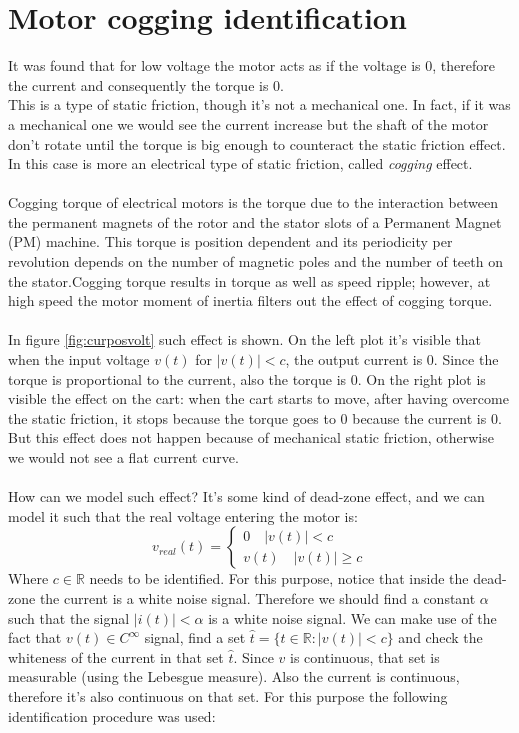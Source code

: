 \section{Motor cogging identification}
It was found that for low voltage the motor acts as if the voltage is $0$, therefore the current and consequently the torque is $0$.\\
This is  a type of static friction, though it's not a mechanical one. In fact, if it was a mechanical one we would see the current increase but the shaft of the motor don't rotate until the torque is big enough to counteract the static friction effect. In this case is more an electrical type of static friction, called \emph{cogging} effect. \\ \\

Cogging torque of electrical motors is the torque due to the interaction between the permanent magnets of the rotor and the stator slots of a Permanent Magnet (PM) machine. This torque is position dependent and its periodicity per revolution depends on the number of magnetic poles and the number of teeth on the stator.Cogging torque results in torque as well as speed ripple; however, at high speed the motor moment of inertia filters out the effect of cogging torque.
\\ \\
In figure \ref{fig:curposvolt} such effect is shown. On the left plot it's visible that when the input voltage $v(t)$ for $|v(t)|< c$, the output current is $0$. Since the torque is proportional to the current, also the torque is $0$. On the right plot is visible the effect on the cart: when the cart starts to move, after having overcome the static friction, it stops because the torque goes to $0$ because the current is $0$. But this effect does not happen because of mechanical static friction, otherwise we would not see a flat current curve.  \\ \\
How can we model such effect? It's some kind of dead-zone effect, and we can model it such that the real voltage entering the motor is:
\begin{equation}
v_{real}(t) = \begin{cases}
0 \quad |v(t)| < c \\
v(t) \quad |v(t)| \geq c
\end{cases}
\end{equation}
Where $c \in \mathbb{R}$ needs to be identified. For this purpose, notice that inside the dead-zone the current is a white noise signal. Therefore we should find a constant $\alpha$ such that the signal $|i(t)| < \alpha$ is a white noise signal. We can make use of the fact that $v(t) \in C^{\infty}$ signal, find a set $\hat{t} = \{ t \in \mathbb{R}: |v(t)| < c \}$ and check the whiteness of the current in that set $\hat{t}$. Since $v$ is continuous, that set is measurable (using the Lebesgue measure). Also the current is continuous, therefore it's also continuous on that set. For this purpose the following identification procedure was used:
